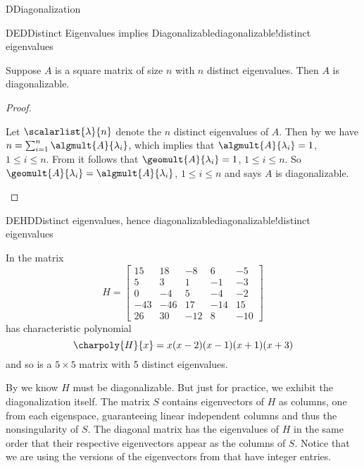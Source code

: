 \begin{subsect}{D}{Diagonalization}
%
%
\begin{theorem}{DED}{Distinct Eigenvalues implies Diagonalizable}{diagonalizable!distinct eigenvalues}
\begin{para}Suppose $A$ is a square matrix of size $n$ with $n$ distinct eigenvalues.  Then $A$ is diagonalizable.\end{para}
\end{theorem}
%
\begin{proof}
%
\begin{para}Let $\scalarlist{\lambda}{n}$ denote the $n$ distinct eigenvalues of $A$.
Then by  we have $n=\sum_{i=1}^n\algmult{A}{\lambda_i}$, which implies that $\algmult{A}{\lambda_i}=1$, $1\leq i\leq n$.  From  it follows that $\geomult{A}{\lambda_i}=1$, $1\leq i\leq n$.  So $\geomult{A}{\lambda_i}=\algmult{A}{\lambda_i}$, $1\leq i\leq n$ and  says $A$ is diagonalizable.\end{para}
%
\end{proof}
%
\begin{example}{DEHD}{Distinct eigenvalues, hence diagonalizable}{diagonalizable!distinct eigenvalues}
\begin{para}In  the matrix
%
\begin{equation*}
H=
\begin{bmatrix}
15 & 18 & -8 & 6 & -5\\
5 & 3 & 1 & -1 & -3\\
0 & -4 & 5 & -4 & -2\\
-43 & -46 & 17 & -14 & 15\\
26 & 30 & -12 & 8 & -10
\end{bmatrix}
\end{equation*}
%
has characteristic polynomial
%
\begin{equation*}
\charpoly{H}{x}=x(x-2)(x-1)(x+1)(x+3)
\end{equation*}
and so is a $5\times 5$ matrix with 5 distinct eigenvalues.\end{para}
%
\begin{para}By  we know $H$ must be diagonalizable.  But just for practice, we exhibit the diagonalization itself.  The matrix $S$ contains eigenvectors of $H$ as columns, one from each eigenspace, guaranteeing linear independent columns and thus the nonsingularity of $S$.  The diagonal matrix has the eigenvalues of $H$ in the same order that their respective eigenvectors appear as the columns of $S$.  Notice that we are using the versions of the eigenvectors from  that have integer entries.

\end{para}
\end{example}
\end{subsect}
